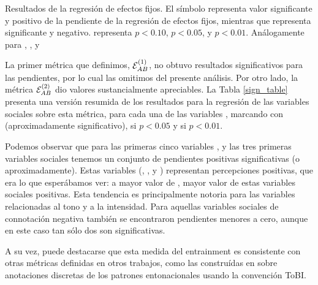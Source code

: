 
\begin{table}[t]

\caption{Resultados de la regresión de efectos fijos. El símbolo \psl representa valor significante y positivo de la pendiente de la regresión de efectos fijos, mientras que \nsl representa significante y negativo. \psl representa $p < 0.10$, \ppsl $p < 0.05$, y \pppsl $p < 0.01$. Análogamente para \nsl, \nnsl, y \nnnsl }
\label{sign_table}
\end{table}

\newcommand{\slopeestim}[1] { $\estslope \sim #1$ }

La primer métrica que definimos, $\mathcal{E}_{AB}^{(1)}$, no obtuvo resultados significativos para las pendientes, por lo cual las omitimos del presente análisis. Por otro lado, la métrica $\mathcal{E}_{AB}^{(2)}$ dio valores sustancialmente apreciables. La Tabla \ref{sign_table} presenta una versión resumida de los resultados para la regresión de las variables sociales sobre esta métrica, para cada una de las variables \ap, marcando con \psl (aproximadamente significativo), \ppsl si $p < 0.05$ y \pppsl si $p < 0.01$.

Podemos observar que para las primeras cinco variables \ap, y las tres primeras variables sociales tenemos un conjunto de pendientes positivas significativas (o aproximadamente). Estas variables (\svcontributes, \svclear, y \svengaged) representan percepciones positivas, que era lo que esperábamos ver: a mayor valor de \entrainment, mayor valor de estas variables sociales positivas. Esta tendencia es principalmente notoria para las variables \ap relacionadas al tono y a la intensidad. Para aquellas variables sociales de connotación negativa también se encontraron pendientes menores a cero, aunque en este caso tan sólo dos son significativas.

A su vez, puede destacarse que esta medida del entrainment es consistente con otras métricas definidas en otros trabajos, como las construídas en \cite{gravano2015backward} sobre anotaciones discretas de los patrones entonacionales usando la convención ToBI\cite{pitrelli1994evaluation}.
